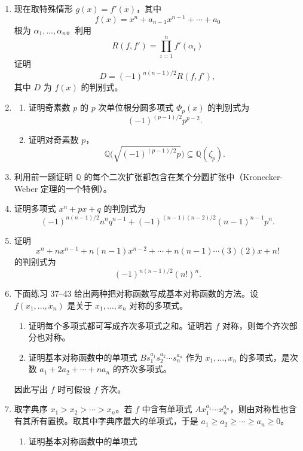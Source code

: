 \begin{enumerate}[label=\arabic*.]
\begin{enumerate}[label=(\alph*)]
		\[
		R(f,g)=a_n^m b_m^n\prod_{i=1}^n\prod_{j=1}^m(x_i-y_j).
		\]
		\item 证明该乘积也可写成
		\[
		R(f,g)=a_n^m\prod_{i=1}^n g(x_i)=(-1)^{nm}b_m^n\prod_{j=1}^m f(y_j).
		\]
		这给出把 $g$ 在 $f$ 的根上取值的乘积与把 $f$ 在 $g$ 的根上取值的乘积之间的互反关系。
	\end{enumerate}
	\item 现在取特殊情形 $g(x)=f'(x)$，其中
	\[
	f(x)=x^n+a_{n-1}x^{n-1}+\cdots+a_0
	\]
	根为 $\alpha_1,
	\ldots,\alpha_n$。利用
	\[
	R(f,f')=\prod_{i=1}^n f'(\alpha_i)
	\]
	证明
	\[
	D=(-1)^{n(n-1)/2}R(f,f'),
	\]
	其中 $D$ 为 $f(x)$ 的判别式。
	\item 
	\begin{enumerate}[label=(\alph*)]
		\item 证明奇素数 $p$ 的 $p$ 次单位根分圆多项式 $\Phi_p(x)$ 的判别式为
		\[
		(-1)^{(p-1)/2}p^{p-2}.
		\]
		\item 证明对奇素数 $p$，
		\[
		\mathbb Q\bigl(\sqrt{(-1)^{(p-1)/2}p}\bigr)\subseteq \mathbb Q(\zeta_p).
		\]
	\end{enumerate}
	\item 利用前一题证明 $\mathbb Q$ 的每个二次扩张都包含在某个分圆扩张中（Kronecker-Weber 定理的一个特例）。
	\item 证明多项式 $x^n+px+q$ 的判别式为
	\[
	(-1)^{n(n-1)/2}n^nq^{n-1}+(-1)^{(n-1)(n-2)/2}(n-1)^{n-1}p^n.
	\]
	\item 证明
	\[
	x^n+nx^{n-1}+n(n-1)x^{n-2}+\cdots+n(n-1)\cdots(3)(2)x+n!
	\]
	的判别式为
	\[
	(-1)^{n(n-1)/2}(n!)^n.
	\]
	\item 下面练习 37--43 给出两种把对称函数写成基本对称函数的方法。设 $f(x_1,
	\ldots,x_n)$ 是关于 $x_1,
	\ldots,x_n$ 对称的多项式。
	\begin{enumerate}[label=(\alph*)]
		\item 证明每个多项式都可写成齐次多项式之和。证明若 $f$ 对称，则每个齐次部分也对称。
		\item 证明基本对称函数中的单项式 $Bs_1^{a_1}s_2^{a_2}\cdots s_n^{a_n}$ 作为 $x_1,
		\ldots,x_n$ 的多项式，是次数 $a_1+2a_2+\cdots+na_n$ 的齐次多项式。
	\end{enumerate}
	因此写出 $f$ 时可假设 $f$ 齐次。
	\item 取字典序 $x_1>x_2>\cdots>x_n$。若 $f$ 中含有单项式 $Ax_1^{a_1}\cdots x_n^{a_n}$，则由对称性也含有其所有置换。取其中字典序最大的单项式，于是 $a_1\ge a_2\ge\cdots\ge a_n\ge0$。
	\begin{enumerate}[label=(\alph*)]
		\item 证明基本对称函数中的单项式

\end{enumerate}
\end{enumerate}
